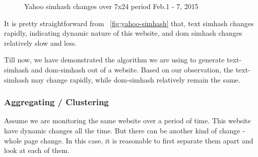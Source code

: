\begin{figure}[t]
  \centering
  \caption{Yahoo simhash changes over 7x24 period Feb.1 - 7, 2015}
  \label{fig:yahoo-simhash}
\end{figure}

It is pretty straightforward from ~\autoref{fig:yahoo-simhash} that,
text simhash changes rapidly, indicating dynamic nature of this
website, and dom simhash changes relatively slow and less.

Till now, we have demonstrated the algorithm we are using to generate
text-simhash and dom-simhash out of a website. Based on our observation, the
text-simhash may change rapidly, while dom-simhash relatively remain the same.

\subsubsection{Aggregating / Clustering}
Assume we are monitoring the same website over a period of time. This website
have dynamic changes all the time. But there can be another kind of change -
whole page change. In this case, it is reasonable to first separate them apart
and look at each of them.

